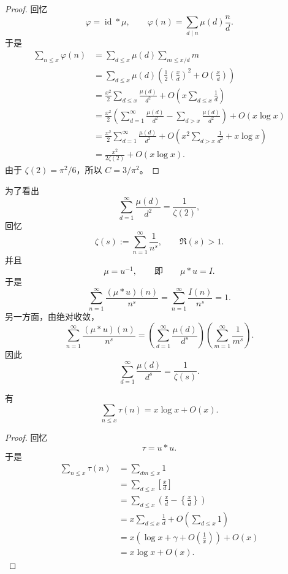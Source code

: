 \begin{proof}
	回忆
	\[
		\varphi=\operatorname{id}*\mu,
		\qquad
		\varphi(n)=\sum_{d\mid n}\mu(d)\frac nd.
	\]
	于是
	\[
	\begin{aligned}
		\sum_{n\leq x}\varphi(n)
		&=
		\sum_{d\leq x}\mu(d)\sum_{m\leq x/d}m \\
		&=
		\sum_{d\leq x}\mu(d)
		\left(\frac12\left(\frac xd\right)^2+O\left(\frac xd\right)\right) \\
		&=
		\frac{x^2}{2}\sum_{d\leq x}\frac{\mu(d)}{d^2}
		+
		O\left(x\sum_{d\leq x}\frac1d\right) \\
		&=
		\frac{x^2}{2}
		\left(\sum_{d=1}^\infty\frac{\mu(d)}{d^2}
		-\sum_{d>x}\frac{\mu(d)}{d^2}\right)
		+O(x\log x) \\
		&=
		\frac{x^2}{2}\sum_{d=1}^\infty\frac{\mu(d)}{d^2}
		+O\left(x^2\sum_{d>x}\frac1{d^2}+x\log x\right) \\
		&=
		\frac{x^2}{2\zeta(2)}+O(x\log x).
	\end{aligned}
	\]
	由于 $\zeta(2)=\pi^2/6$，所以 $C=3/\pi^2$。
\end{proof}

\begin{remark}
	为了看出
	\[
		\sum_{d=1}^\infty\frac{\mu(d)}{d^2}
		=
		\frac1{\zeta(2)},
	\]
	回忆
	\[
		\zeta(s):=\sum_{n=1}^\infty\frac1{n^s},
		\qquad
		\Re(s)>1.
	\]
	并且
	\[
		\mu=u^{-1},
		\qquad \text{即}\qquad
		\mu*u=I.
	\]
	于是
	\[
		\sum_{n=1}^\infty\frac{(\mu*u)(n)}{n^s}
		=
		\sum_{n=1}^\infty\frac{I(n)}{n^s}
		=
		1.
	\]
	另一方面，由绝对收敛，
	\[
		\sum_{n=1}^\infty\frac{(\mu*u)(n)}{n^s}
		=
		\left(\sum_{d=1}^\infty\frac{\mu(d)}{d^s}\right)
		\left(\sum_{m=1}^\infty\frac1{m^s}\right).
	\]
	因此
	\[
		\sum_{d=1}^\infty\frac{\mu(d)}{d^s}
		=
		\frac1{\zeta(s)}.
	\]
\end{remark}

\begin{theorem}
	有
	\[
		\sum_{n\leq x}\tau(n)
		=
		x\log x+O(x).
	\]
\end{theorem}

\begin{proof}
	回忆
	\[
		\tau=u*u.
	\]
	于是
	\[
	\begin{aligned}
		\sum_{n\leq x}\tau(n)
		&=
		\sum_{dm\leq x}1 \\
		&=
		\sum_{d\leq x}\left[\frac xd\right] \\
		&=
		\sum_{d\leq x}\left(\frac xd-\left\{\frac xd\right\}\right) \\
		&=
		x\sum_{d\leq x}\frac1d+O\left(\sum_{d\leq x}1\right) \\
		&=
		x\left(\log x+\gamma+O\left(\frac1x\right)\right)+O(x) \\
		&=
		x\log x+O(x).
	\end{aligned}
	\]
\end{proof}

